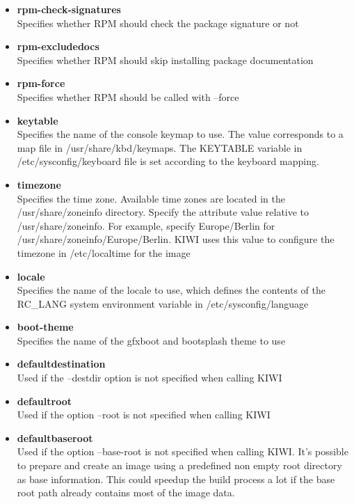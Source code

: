 \begin{itemize}
\item \textbf{rpm-check-signatures}\\
      Specifies whether RPM should check the package signature or not
\item \textbf{rpm-excludedocs}\\
      Specifies whether RPM should skip installing package documentation
\item \textbf{rpm-force}\\
      Specifies whether RPM should be called with --force
\item \textbf{keytable}\\
      Specifies the name of the console keymap to use. The value corresponds
      to a map file in /usr/share/kbd/keymaps. The KEYTABLE variable in
      /etc/sysconfig/keyboard file is set according to the keyboard
      mapping.
\item \textbf{timezone}\\
      Specifies the time zone. Available time zones are located in the
      /usr/share/zoneinfo directory. Specify the attribute value relative to
      /usr/share/zoneinfo. For example, specify Europe/Berlin for
      /usr/share/zoneinfo/Europe/Berlin. KIWI uses this value to configure
      the timezone in /etc/localtime for the image
\item \textbf{locale}\\
      Specifies the name of the locale to use, which defines the
      contents of the RC\_LANG system environment variable in
      /etc/sysconfig/language
\item \textbf{boot-theme}\\
      Specifies the name of the gfxboot and bootsplash theme to use
\item \textbf{defaultdestination}\\
      Used if the --destdir option is not specified when calling KIWI
\item \textbf{defaultroot}\\
      Used if the option --root is not specified when calling KIWI
\item \textbf{defaultbaseroot}\\
      Used if the option --base-root is not specified when
      calling KIWI. It's possible to prepare and create an image using a
      predefined non empty root directory as base information.
      This could speedup the build process a lot if the base root path
      already contains most of the image data.
\end{itemize}

